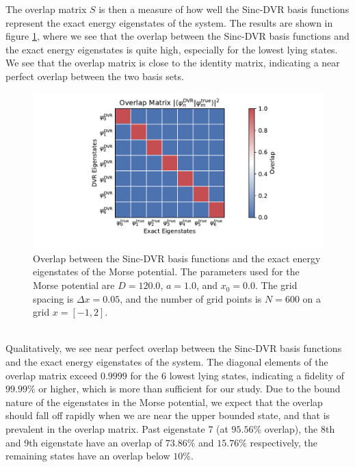 \documentclass{subfiles}
\begin{document}
The overlap matrix $S$ is then a measure of how well the Sinc-DVR basis functions represent the exact energy eigenstates of the system. The results are shown in figure \ref{fig:dvr_validation_overlap}, where we see that the overlap between the Sinc-DVR basis functions and the exact energy eigenstates is quite high, especially for the lowest lying states. We see that the overlap matrix is close to the identity matrix, indicating a near perfect overlap between the two basis sets.
\begin{figure}[h!]
    \centering
    \includegraphics[width=\textwidth]{figs/dvr_validation_overlap.pdf}
    \caption{Overlap between the Sinc-DVR basis functions and the exact energy eigenstates of the Morse potential. The parameters used for the Morse potential are $D = 120.0$, $a = 1.0$, and $x_0 = 0.0$. The grid spacing is $\Delta x = 0.05$, and the number of grid points is $N = 600$ on a grid $x=[-1, 2]$.}
    \label{fig:dvr_validation_overlap}
\end{figure}
\\
Qualitatively, we see near perfect overlap between the Sinc-DVR basis functions and the exact energy eigenstates of the system. The diagonal elements of the overlap matrix exceed $0.9999$ for the 6 lowest lying states, indicating a fidelity of $99.99\%$ or higher, which is more than sufficient for our study. Due to the bound nature of the eigenstates in the Morse potential, we expect that the overlap should fall off rapidly when we are near the upper bounded state, and that is prevalent in the overlap matrix. Past eigenstate 7 (at $95.56\%$ overlap), the 8th and 9th eigenstate have an overlap of $73.86\%$ and $15.76\%$ respectively, the remaining states have an overlap below $10\%$. 
\end{document}
